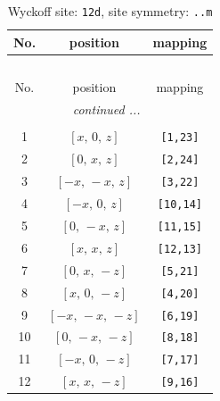 \documentclass[fleqn,8pt]{jsarticle}
\begin{document}
\renewcommand{\arraystretch}{1.2}
\begin{longtable}{ccc}
\caption{Wyckoff site: {\tt 12d}, site symmetry: {\tt ..m}}
 \\
 \hline \hline
No. & position & mapping \\ \hline \endfirsthead

\multicolumn{2}{l}{\tablename\ \thetable{}} \\
 \hline \hline
No. & position & mapping \\ \hline \endhead

 \hline \hline
\multicolumn{2}{r}{\footnotesize\it continued ...} \\ \endfoot

 \hline \hline
\multicolumn{2}{r}{} \\ \endlastfoot

1 & $\left[ x,\, 0,\, z \right]$ & {\tt [1,23]} \\ \hline
2 & $\left[ 0,\, x,\, z \right]$ & {\tt [2,24]} \\ \hline
3 & $\left[ - x,\, - x,\, z \right]$ & {\tt [3,22]} \\ \hline
4 & $\left[ - x,\, 0,\, z \right]$ & {\tt [10,14]} \\ \hline
5 & $\left[ 0,\, - x,\, z \right]$ & {\tt [11,15]} \\ \hline
6 & $\left[ x,\, x,\, z \right]$ & {\tt [12,13]} \\ \hline
7 & $\left[ 0,\, x,\, - z \right]$ & {\tt [5,21]} \\ \hline
8 & $\left[ x,\, 0,\, - z \right]$ & {\tt [4,20]} \\ \hline
9 & $\left[ - x,\, - x,\, - z \right]$ & {\tt [6,19]} \\ \hline
10 & $\left[ 0,\, - x,\, - z \right]$ & {\tt [8,18]} \\ \hline
11 & $\left[ - x,\, 0,\, - z \right]$ & {\tt [7,17]} \\ \hline
12 & $\left[ x,\, x,\, - z \right]$ & {\tt [9,16]} \\
\end{longtable}
\renewcommand{\arraystretch}{1.2}
\end{document}
